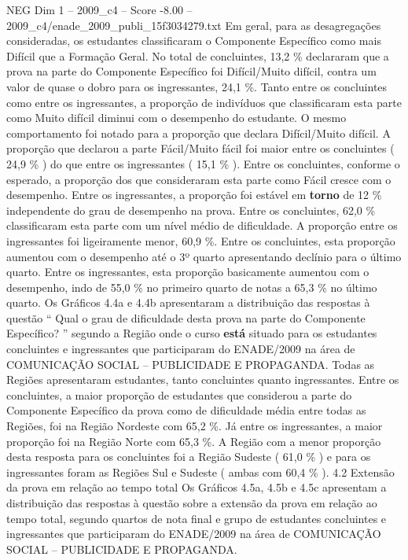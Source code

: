 \begin{textsample}{NEG Dim 1 – 2009\_c4 – Score -8.00 – 2009\_c4/enade\_2009\_publi\_15f3034279.txt}
Em geral, para as desagregações consideradas, os estudantes classificaram o Componente Específico como mais Difícil que a Formação Geral.
No total de concluintes, 13,2 \% declararam que a prova na parte do Componente Específico foi Difícil/Muito difícil, contra um valor de quase o dobro para os ingressantes, 24,1 \%.
Tanto entre os concluintes como entre os ingressantes, a proporção de indivíduos que classificaram esta parte como Muito difícil diminui com o desempenho do estudante.
O mesmo comportamento foi notado para a proporção que declara Difícil/Muito difícil.
A proporção que declarou a parte Fácil/Muito fácil foi maior entre os concluintes ( 24,9 \% ) do que entre os ingressantes ( 15,1 \% ).
Entre os concluintes, conforme o esperado, a proporção dos que consideraram esta parte como Fácil cresce com o desempenho.
Entre os ingressantes, a proporção foi estável em \textbf{torno} de 12 \% independente do grau de desempenho na prova.
Entre os concluintes, 62,0 \% classificaram esta parte com um nível médio de dificuldade.
A proporção entre os ingressantes foi ligeiramente menor, 60,9 \%.
Entre os concluintes, esta proporção aumentou com o desempenho até o 3º quarto apresentando declínio para o último quarto.
Entre os ingressantes, esta proporção basicamente aumentou com o desempenho, indo de 55,0 \% no primeiro quarto de notas a 65,3 \% no último quarto.
Os Gráficos 4.4a e 4.4b apresentaram a distribuição das respostas à questão “ Qual o grau de dificuldade desta prova na parte do Componente Específico? ” segundo a Região onde o curso \textbf{está} situado para os estudantes concluintes e ingressantes que participaram do ENADE/2009 na área de COMUNICAÇÃO SOCIAL – PUBLICIDADE E PROPAGANDA.
Todas as Regiões apresentaram estudantes, tanto concluintes quanto ingressantes.
Entre os concluintes, a maior proporção de estudantes que considerou a parte do Componente Específico da prova como de dificuldade média entre todas as Regiões, foi na Região Nordeste com 65,2 \%.
Já entre os ingressantes, a maior proporção foi na Região Norte com 65,3 \%.
A Região com a menor proporção desta resposta para os concluintes foi a Região Sudeste ( 61,0 \% ) e para os ingressantes foram as Regiões Sul e Sudeste ( ambas com 60,4 \% ). 4.2 Extensão da prova em relação ao tempo total Os Gráficos 4.5a, 4.5b e 4.5c apresentam a distribuição das respostas à questão sobre a extensão da prova em relação ao tempo total, segundo quartos de nota final e grupo de estudantes concluintes e ingressantes que participaram do ENADE/2009 na área de COMUNICAÇÃO SOCIAL – PUBLICIDADE E PROPAGANDA.

\end{textsample}
